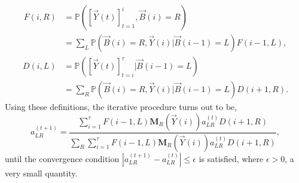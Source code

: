 \documentclass[10pt,twocolumn]{IEEEtran}
\begin{document}
\begin{equation}
    \begin{aligned}
        F(i,R) &= \mathbb{P}([\vec{Y}(t)]_{t=1}^{i},\vec{B}(i)=R)\\
        &= 
        \sum_{L}\mathbb{P}(\vec{B}(i)=R,\vec{Y}(i)|\vec{B}(i-1)=L)F(i-1,L),
    \end{aligned}
\end{equation}
\begin{equation}
    \begin{aligned}
        D(i,L) &= \mathbb{P}([\vec{Y}(t)]_{t=i}^{\tau}|\vec{B}(i-1)=L)\\
        &= \sum_{R}\mathbb{P}(\vec{B}(i)=R,\vec{Y}(i)|\vec{B}(i-1)=L)D(i+1,R).
    \end{aligned}
\end{equation}
Using these definitions, the iterative procedure turns out to be,
\begin{equation}\label{30}
    a_{LR}^{(t+1)} = \frac{\sum_{i=1}^{\tau}F(i-1,L)\mathbf{M}_R(\vec{Y}(i))a_{LR}^{(t)}D(i+1,R)}{\sum_R\sum_{i=1}^{\tau}F(i-1,L)\mathbf{M}_R(\vec{Y}(i))a_{LR}^{(t)}D(i+1,R)},
\end{equation}
until the convergence condition $|a_{LR}^{(t+1)} - a_{LR}^{(t)}| \leq \epsilon$ is satisfied, where $\epsilon > 0$, a very small quantity.
\end{document}
